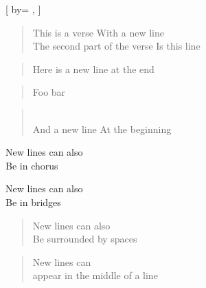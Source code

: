 
\beginsong{}[
  by={
  },
]


\begin{verse}
    This is a verse
    With a new line
    ~\\
    The second part of the verse
    Is this line
\end{verse}


\begin{verse}
    Here is a new line at the end
    ~\\
\end{verse}


\begin{verse}
    Foo bar
\end{verse}


\begin{verse}
    ~\\
    And a new line
    At the beginning
\end{verse}


\begin{chorus}
    New lines can also
    ~\\
    Be in chorus
\end{chorus}


\begin{bridge}
    New lines can also
    ~\\
    Be in bridges
\end{bridge}


\begin{verse}
    New lines can also
    ~\\
    Be surrounded by spaces
\end{verse}


\begin{verse}
    New lines can ~\\ appear in the middle of a line
\end{verse}

\endsong
